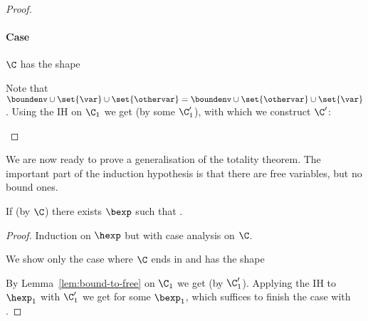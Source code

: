 \begin{proof}
\paragraph{Case \textnormal{}}
$\C$ has the shape
\begin{prooftree}
\end{prooftree}
Note that $\boundenv \cup \set{\var} \cup \set{\othervar} = \boundenv \cup \set{\othervar} \cup \set{\var}$.
Using the IH on $\C_1$ we get  (by some $\C_1'$), with which we construct $\C'$:
\begin{prooftree}
\end{prooftree}

\end{proof}

We are now ready to prove a generalisation of the totality theorem.
The important part of the induction hypothesis is that there are free variables, but no bound ones.

\begin{lemma}
\label{lem:totality}
If \cover{\emptyset}{\benvext}{\hexp} (by $\C$) there exists $\bexp$ such that \trahb{}{\benvext}{\bexp}{\hexp}.
\end{lemma}


\begin{proof}
Induction on $\hexp$ but with case analysis on $\C$.

We show only the case where $\C$ ends in  and has the shape
\begin{prooftree}
\end{prooftree}
By Lemma~\ref{lem:bound-to-free} on $\C_1$ we get  (by $\C_1'$).
Applying the IH to $\hexp_1$ with $\C_1'$ we get  for some $\bexp_1$, which suffices to finish the case with .

\end{proof}

